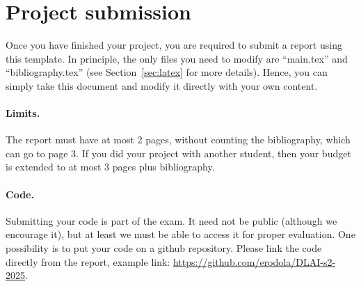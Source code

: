 \documentclass{article}
\begin{document}

\printAffiliationsAndNotice{}

\begin{abstract}
%
This is a \LaTeX template for writing your project report, to be submitted as part of the final exam. The template can not be modified (you can not change margins, spaces, etc.), and using this template is mandatory. Please read the main text for further details.
%
\end{abstract}

\section{Project submission}

Once you have finished your project, you are required to submit a report using this template. In principle, the only files you need to modify are ``main.tex'' and ``bibliography.tex'' (see Section~\ref{sec:latex} for more details). Hence, you can simply take this document and modify it directly with your own content.

\paragraph*{Limits.}
The report must have at most 2 pages, without counting the bibliography, which can go to page 3. If you did your project with another student, then your budget is extended to at most 3 pages plus bibliography.

\paragraph*{Code.} 
Submitting your code is part of the exam. It need not be public (although we encourage it), but at least we must be able to access it for proper evaluation. One possibility is to put your code on a github repository. Please link the code directly from the report, example link: \url{https://github.com/erodola/DLAI-s2-2025}.
\end{document}
